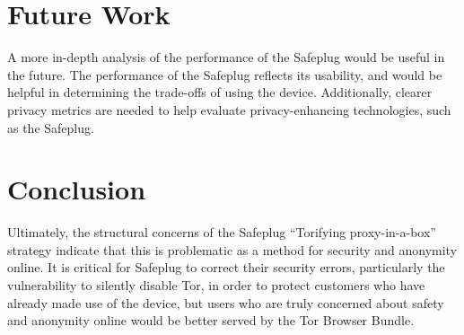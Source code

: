 \documentclass[letterpaper,twocolumn,10pt]{article}
\begin{document}
\section{Future Work}
A more in-depth analysis of the performance of the Safeplug would be useful in the future.  The performance of the Safeplug reflects its usability, and would be helpful in determining the trade-offs of using the device.  Additionally, clearer privacy metrics are needed to help evaluate privacy-enhancing technologies, such as the Safeplug.  

\section{Conclusion}
Ultimately, the structural concerns of the Safeplug ``Torifying proxy-in-a-box'' strategy indicate that this is problematic as a method for security and anonymity online.  It is critical for Safeplug to correct their security errors, particularly the vulnerability to silently disable Tor, in order to protect customers who have already made use of the device, but users who are truly concerned about safety and anonymity online would be better served by the Tor Browser Bundle.

{\footnotesize 
}

\end{document}
